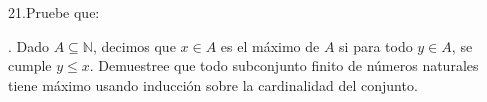 \documentclass[letterpaper]{article}
\newcommand{\N}{\mathds{N}}
\renewcommand{\*}{\cdot}
\theoremstyle{definition}
\begin{document}
\noindent21.Pruebe que:


. Dado $ A \subseteq \N $, decimos que $ x \in A $ es el máximo de $ A $ si para todo $ y \in A $, se cumple $ y \leq x $. Demuestree que todo subconjunto finito de números naturales tiene máximo usando inducción sobre la cardinalidad del conjunto.
\end{document}
